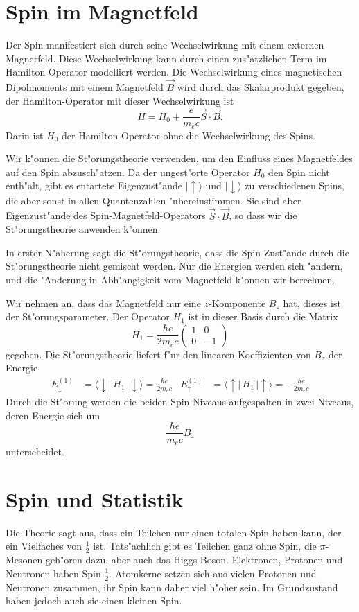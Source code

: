 \section{Spin im Magnetfeld}
Der Spin manifestiert sich durch seine Wechselwirkung mit einem
externen Magnetfeld.
Diese Wechselwirkung kann durch einen zus"atzlichen Term im
Hamilton-Operator modelliert werden.
Die Wechselwirkung eines magnetischen Dipolmoments mit einem
Magnetfeld $\vec B$ wird durch das Skalarprodukt gegeben,
der Hamilton-Operator mit dieser Wechselwirkung ist
\[
H=H_0 + \frac{e}{m_ec}\vec S\cdot\vec B.
\]
Darin ist $H_0$ der Hamilton-Operator ohne die Wechselwirkung 
des Spins.

Wir k"onnen die St"orungstheorie verwenden, um den Einfluss eines
Magnetfeldes auf den Spin abzusch"atzen.
Da der ungest"orte Operator $H_0$ den Spin nicht enth"alt, gibt
es entartete Eigenzust"ande
$|\uparrow\rangle$ und $|\downarrow\rangle$
zu verschiedenen Spins, die aber sonst in allen Quantenzahlen
"ubereinstimmen.
Sie sind aber Eigenzust"ande des Spin-Magnetfeld-Operators
$\vec S\cdot \vec B$, so dass wir die St"orungstheorie anwenden
k"onnen.

In erster N"aherung sagt die St"orungstheorie, dass die Spin-Zust"ande
durch die St"orungstheorie nicht gemischt werden.
Nur die Energien werden sich "andern, und die "Anderung in 
Abh"angigkeit vom Magnetfeld k"onnen wir berechnen.

Wir nehmen an, dass das Magnetfeld nur eine $z$-Komponente $B_z$ hat,
dieses ist der St"orungsparameter.
Der Operator $H_1$ ist in dieser Basis durch die Matrix
\[
H_1=
\frac{\hbar e}{2m_ec}
\begin{pmatrix}
1&0\\
0&-1
\end{pmatrix}
\]
gegeben.
Die St"orungstheorie liefert f"ur den linearen Koeffizienten von $B_z$
der Energie
\begin{align*}
E_\downarrow^{(1)}
&=
\langle \downarrow|\, H_1 \,|\downarrow\rangle
=\frac{\hbar e}{2m_e c}
&
E_\uparrow^{(1)}
&=
\langle \uparrow|\, H_1 \,|\uparrow\rangle
=-\frac{\hbar e}{2m_e c}
\end{align*}
Durch die St"orung werden die beiden Spin-Niveaus aufgespalten
in zwei Niveaus, deren Energie sich um
\[
\frac{\hbar e}{m_e c}B_z
\]
unterscheidet.

\section{Spin und Statistik}
Die Theorie sagt aus, dass ein Teilchen nur einen totalen Spin haben kann,
der ein Vielfaches von $\frac12$ ist. Tats"achlich gibt es Teilchen
ganz ohne Spin, die $\pi$-Mesonen geh"oren dazu, aber auch das Higgs-Boson.
Elektronen, Protonen und Neutronen haben Spin $\frac12$. 
Atomkerne setzen sich aus vielen Protonen und Neutronen zusammen, ihr
Spin kann daher viel h"oher sein. Im Grundzustand haben jedoch auch
sie einen kleinen Spin.

